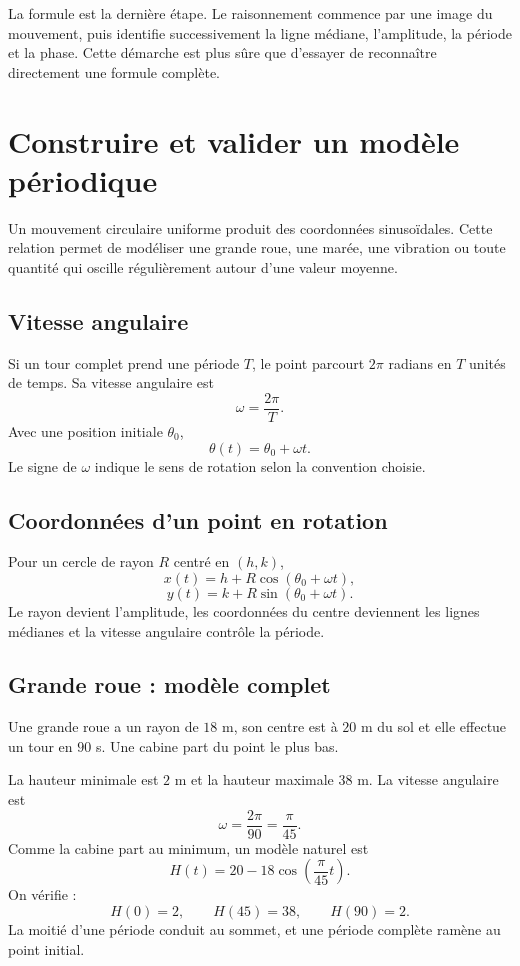 \documentclass[12pt,a4paper,openany]{book}
\begin{document}
\begin{connectionbox}
La formule est la dernière étape. Le raisonnement commence par une image du mouvement, puis identifie successivement la ligne médiane, l'amplitude, la période et la phase. Cette démarche est plus sûre que d'essayer de reconnaître directement une formule complète.
\end{connectionbox}


\section{Construire et valider un modèle périodique}

Un mouvement circulaire uniforme produit des coordonnées sinusoïdales. Cette relation permet de modéliser une grande roue, une marée, une vibration ou toute quantité qui oscille régulièrement autour d'une valeur moyenne.

\subsection{Vitesse angulaire}

Si un tour complet prend une période $T$, le point parcourt $2\pi$ radians en $T$ unités de temps. Sa vitesse angulaire est
\[
\omega=\frac{2\pi}{T}.
\]
Avec une position initiale $\theta_0$,
\[
\theta(t)=\theta_0+\omega t.
\]
Le signe de $\omega$ indique le sens de rotation selon la convention choisie.

\subsection{Coordonnées d'un point en rotation}

Pour un cercle de rayon $R$ centré en $(h,k)$,
\[
x(t)=h+R\cos(\theta_0+\omega t),
\]
\[
y(t)=k+R\sin(\theta_0+\omega t).
\]
Le rayon devient l'amplitude, les coordonnées du centre deviennent les lignes médianes et la vitesse angulaire contrôle la période.

\subsection{Grande roue : modèle complet}

Une grande roue a un rayon de $18$ m, son centre est à $20$ m du sol et elle effectue un tour en $90$ s. Une cabine part du point le plus bas.

La hauteur minimale est $2$ m et la hauteur maximale $38$ m. La vitesse angulaire est
\[
\omega=\frac{2\pi}{90}=\frac\pi{45}.
\]
Comme la cabine part au minimum, un modèle naturel est
\[
H(t)=20-18\cos\left(\frac\pi{45}t\right).
\]
On vérifie :
\[
H(0)=2,
\qquad
H(45)=38,
\qquad
H(90)=2.
\]
La moitié d'une période conduit au sommet, et une période complète ramène au point initial.
\end{document}
